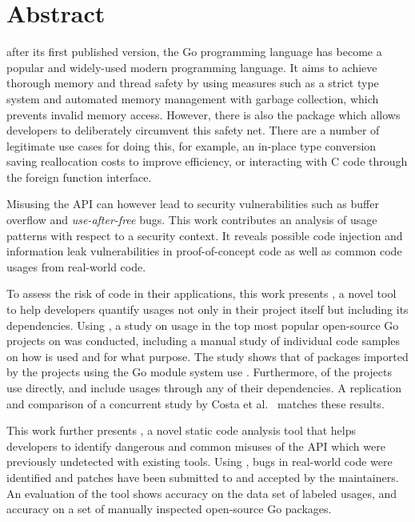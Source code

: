 \chapter*{Abstract}

 after its first published version, the Go programming language has become a popular and
widely-used modern programming language.
It aims to achieve thorough memory and thread safety by using measures such as a strict type system and automated memory
management with garbage collection, which prevents invalid memory access.
However, there is also the \unsafe{} package which allows developers to deliberately circumvent this safety net.
There are a number of legitimate use cases for doing this, for example, an in-place type conversion saving reallocation
costs to improve efficiency, or interacting with C code through the foreign function interface.

Misusing the \unsafe{} API can however lead to security vulnerabilities such as buffer overflow and
\textit{use-after-free} bugs.
This work contributes an analysis of \unsafe{} usage patterns with respect to a security context.
It reveals possible code injection and information leak vulnerabilities in proof-of-concept code as well as common code
usages from real-world code.

To assess the risk of \unsafe{} code in their applications, this work presents \toolGeiger{}, a novel tool to help
developers quantify \unsafe{} usages not only in their project itself but including its dependencies.
Using \toolGeiger{}, a study on \unsafe{} usage in the top \projsTotal{} most popular open-source Go projects on
\github{} was conducted, including a manual study of \numberLabeledCodeSnippets{} individual code samples on how
\unsafe{} is used and for what purpose.
The study shows that \percentageUnsafePackages{} of packages imported by the projects using the Go module system use
\unsafe{}.
Furthermore, \percentageUnsafeProjects{} of the projects use \unsafe{} directly, and
\percentageUnsafeTransitiveWithDependencies{} include \unsafe{} usages through any of their dependencies.
A replication and comparison of a concurrent study by Costa et al.~\cite{costa2020} matches these results.

This work further presents \toolSafer{}, a novel static code analysis tool that helps developers to identify
 dangerous and common misuses of the \unsafe{} API which were previously undetected with existing tools.
Using \toolSafer{}, \numberBugsFixed{} bugs in real-world code were identified and patches have been submitted to and
accepted by the maintainers.
An evaluation of the tool shows \goSaferEvaluationDatasetGosaferAccuracy{} accuracy on the data set of labeled \unsafe{}
usages, and \goSaferEvaluationPackagesGosaferAccuracy{} accuracy on a set of manually inspected open-source Go packages.


